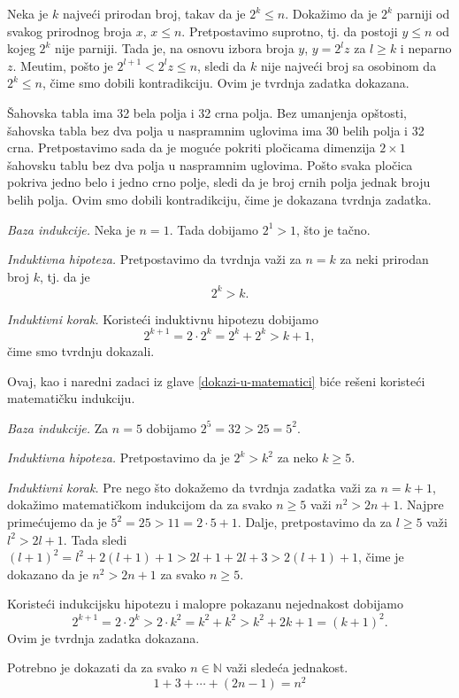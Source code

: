 Neka je $k$ najve\' ci prirodan broj, takav da je $2^k\leq n$. Doka\v zimo da je $2^k$ parniji od svakog prirodnog broja $x$, $x\leq n$. Pretpostavimo suprotno, tj. da postoji $y\leq n$ od kojeg $2^k$ nije parniji. Tada je, na osnovu izbora broja $y$, $y=2^lz$ za $l\geq k$ i neparno $z$. Me\dj utim, po\v sto je $2^{l+1}<2^lz\leq n$, sledi da $k$ nije najve\' ci broj sa osobinom da $2^k\leq n$, \v cime smo dobili kontradikciju. Ovim je tvrdnja zadatka dokazana.

\v Sahovska tabla ima 32 bela polja i 32 crna polja. Bez umanjenja op\v stosti, \v sahovska tabla bez dva polja u naspramnim uglovima ima 30 belih polja i 32 crna. Pretpostavimo sada da je mogu\' ce pokriti plo\v cicama dimenzija $2\times 1$ \v sahovsku tablu bez dva polja u naspramnim uglovima. Po\v sto svaka plo\v cica pokriva jedno belo i jedno crno polje, sledi da je broj crnih polja jednak broju belih polja. Ovim smo dobili kontradikciju, \v cime je dokazana tvrdnja zadatka.


{\it Baza indukcije.} Neka je $n=1$. Tada dobijamo $2^1>1$, \v sto je ta\v cno.

{\it Induktivna hipoteza.} Pretpostavimo da tvrdnja va\v zi za $n=k$ za neki prirodan broj $k$, tj. da je
\[2^k>k.\]

{\it Induktivni korak.} Koriste\' ci induktivnu hipotezu dobijamo
\[2^{k+1}=2\cdot 2^k=2^k+2^k>k+1,\]
\v cime smo tvrdnju dokazali.

 Ovaj, kao i naredni zadaci iz glave \ref{dokazi-u-matematici} bi\' ce re\v seni koriste\' ci matemati\v cku indukciju.

{\it Baza indukcije.} Za $n=5$ dobijamo $2^5=32>25=5^2$.

{\it Induktivna hipoteza.} Pretpostavimo da je $2^k>k^2$ za neko $k\geq 5$.

{\it Induktivni korak.} Pre nego \v sto doka\v zemo da tvrdnja zadatka va\v zi za $n=k+1$, doka\v zimo matemati\v ckom indukcijom da za svako $n\geq 5$ va\v zi $n^2>2n+1$. Najpre prime\' cujemo da je $5^2=25>11=2\cdot 5+1$. Dalje, pretpostavimo da za $l\geq 5$ va\v zi $l^2>2l+1$. Tada sledi $(l+1)^2=l^2+2(l+1)+1>2l+1+2l+3>2(l+1)+1$, \v cime je dokazano da je $n^2>2n+1$ za svako $n\geq 5$.

Koriste\' ci indukcijsku hipotezu i malopre pokazanu nejednakost dobijamo
\[ 2^{k+1}=2\cdot 2^k>2\cdot k^2=k^2+k^2>k^2+2k+1=(k+1)^2. \]
Ovim je tvrdnja zadatka dokazana.

Potrebno je dokazati da za svako $n\in\mathbb N$ va\v zi slede\' ca jednakost.
\[1+3+\cdots+(2n-1)=n^2\]

